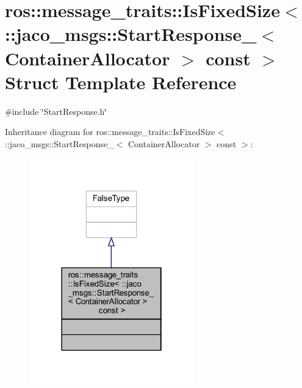 \hypertarget{structros_1_1message__traits_1_1IsFixedSize_3_01_1_1jaco__msgs_1_1StartResponse___3_01ContainerAllocator_01_4_01const_01_01_4}{}\section{ros\+:\+:message\+\_\+traits\+:\+:Is\+Fixed\+Size$<$ \+:\+:jaco\+\_\+msgs\+:\+:Start\+Response\+\_\+$<$ Container\+Allocator $>$ const $>$ Struct Template Reference}
\label{structros_1_1message__traits_1_1IsFixedSize_3_01_1_1jaco__msgs_1_1StartResponse___3_01ContainerAllocator_01_4_01const_01_01_4}


{\ttfamily \#include \char`\"{}Start\+Response.\+h\char`\"{}}



Inheritance diagram for ros\+:\+:message\+\_\+traits\+:\+:Is\+Fixed\+Size$<$ \+:\+:jaco\+\_\+msgs\+:\+:Start\+Response\+\_\+$<$ Container\+Allocator $>$ const $>$\+:
\nopagebreak
\begin{figure}[H]
\begin{center}
\leavevmode
\includegraphics[width=202pt]{d7/d31/structros_1_1message__traits_1_1IsFixedSize_3_01_1_1jaco__msgs_1_1StartResponse___3_01ContainerAe74741e1f0473a8ff78bdfe87bf73155}
\end{center}
\end{figure}


